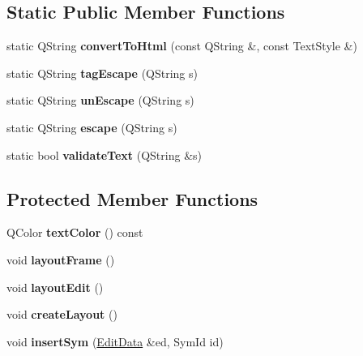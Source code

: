 \subsection*{Static Public Member Functions}
\begin{DoxyCompactItemize}
\item 
\mbox{\label{class_ms_1_1_text_ab02fbd2ca662bc171a91fae6fee5de4e}} 
static Q\+String {\bfseries convert\+To\+Html} (const Q\+String \&, const Text\+Style \&)
\item 
\mbox{\label{class_ms_1_1_text_ae0afd38c050d415c4cf576b0337f8078}} 
static Q\+String {\bfseries tag\+Escape} (Q\+String s)
\item 
\mbox{\label{class_ms_1_1_text_ae01db230b6cc577d0637e9808ec86f65}} 
static Q\+String {\bfseries un\+Escape} (Q\+String s)
\item 
\mbox{\label{class_ms_1_1_text_ae42dc517f05651f2b007e7a35e7c4389}} 
static Q\+String {\bfseries escape} (Q\+String s)
\item 
\mbox{\label{class_ms_1_1_text_a1c2c674a37c7465f5c89af3f7110ac3f}} 
static bool {\bfseries validate\+Text} (Q\+String \&s)
\end{DoxyCompactItemize}
\subsection*{Protected Member Functions}
\begin{DoxyCompactItemize}
\item 
\mbox{\label{class_ms_1_1_text_ac1c0adca5a4ff6267041a1e5dc282ad5}} 
Q\+Color {\bfseries text\+Color} () const
\item 
\mbox{\label{class_ms_1_1_text_a69b38bf5686a5e0bee8e570965b82796}} 
void {\bfseries layout\+Frame} ()
\item 
\mbox{\label{class_ms_1_1_text_a0614d1cc9059e8e040f9fba623d9d6f6}} 
void {\bfseries layout\+Edit} ()
\item 
\mbox{\label{class_ms_1_1_text_a0bad864981be30fad9528fd916510610}} 
void {\bfseries create\+Layout} ()
\item 
\mbox{\label{class_ms_1_1_text_a3427575ecc3ff804d681564fb781f63f}} 
void {\bfseries insert\+Sym} (\hyperlink{class_ms_1_1_edit_data}{Edit\+Data} \&ed, Sym\+Id id)
\end{DoxyCompactItemize}
